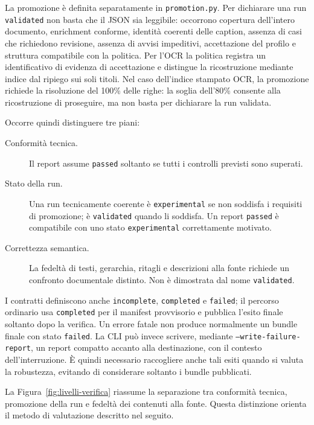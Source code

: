 La promozione è definita separatamente in \texttt{promotion.py}. Per dichiarare una run \texttt{validated} non basta che il JSON sia leggibile: occorrono copertura dell'intero documento, enrichment conforme, identità coerenti delle caption, assenza di casi che richiedono revisione, assenza di avvisi impeditivi, accettazione del profilo e struttura compatibile con la politica. Per l'OCR la politica registra un identificativo di evidenza di accettazione e distingue la ricostruzione mediante indice dal ripiego sui soli titoli. Nel caso dell'indice stampato OCR, la promozione richiede la risoluzione del 100\% delle righe: la soglia dell'80\% consente alla ricostruzione di proseguire, ma non basta per dichiarare la run validata.

Occorre quindi distinguere tre piani:
\begin{description}
    \item[Conformità tecnica.] Il report assume \texttt{passed} soltanto se tutti i controlli previsti sono superati.
    \item[Stato della run.] Una run tecnicamente coerente è \texttt{experimental} se non soddisfa i requisiti di promozione; è \texttt{validated} quando li soddisfa. Un report \texttt{passed} è compatibile con uno stato \texttt{experimental} correttamente motivato.
    \item[Correttezza semantica.] La fedeltà di testi, gerarchia, ritagli e descrizioni alla fonte richiede un confronto documentale distinto. Non è dimostrata dal nome \texttt{validated}.
\end{description}

I contratti definiscono anche \texttt{incomplete}, \texttt{completed} e \texttt{failed}; il percorso ordinario usa \texttt{completed} per il manifest provvisorio e pubblica l'esito finale soltanto dopo la verifica. Un errore fatale non produce normalmente un bundle finale con stato \texttt{failed}. La CLI può invece scrivere, mediante \texttt{--write-failure-report}, un report compatto accanto alla destinazione, con il contesto dell'interruzione. È quindi necessario raccogliere anche tali esiti quando si valuta la robustezza, evitando di considerare soltanto i bundle pubblicati.

La Figura~\ref{fig:livelli-verifica} riassume la separazione tra conformità tecnica, promozione della run e fedeltà dei contenuti alla fonte. Questa distinzione orienta il metodo di valutazione descritto nel seguito.



